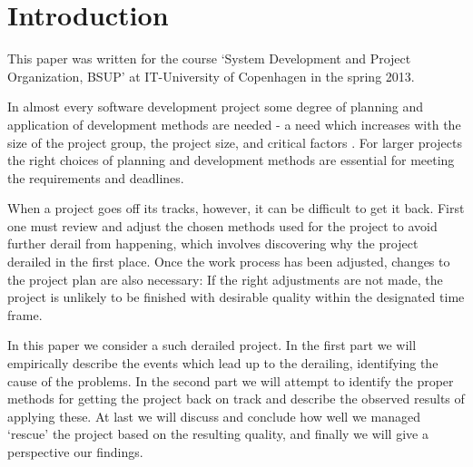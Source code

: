 \section{Introduction}
This paper was written for the course `System Development and Project Organization, BSUP' at IT-University of Copenhagen in the spring 2013.

In almost every software development project some degree of planning and application of development methods are needed - a need which increases with the size of the project group, the project size, and critical factors \cite[p. 134]{ac}. For larger projects the right choices of planning and development methods are essential for meeting the requirements and deadlines.

When a project goes off its tracks, however, it can be difficult to get it back. First one must review and adjust the chosen methods used for the project to avoid further derail from happening, which involves discovering why the project derailed in the first place.
Once the work process has been adjusted, changes to the project plan are also necessary: If the right adjustments are not made, the project is unlikely to be finished with desirable quality within the designated time frame.

In this paper we consider a such derailed project.
In the first part we will empirically describe the events which lead up to the derailing, identifying the cause of the problems. In the second part we will attempt to identify the proper methods for getting the project back on track and describe the observed results of applying these. At last we will discuss and conclude how well we managed `rescue' the project based on the resulting quality, and finally we will give a perspective our findings.
\newpage